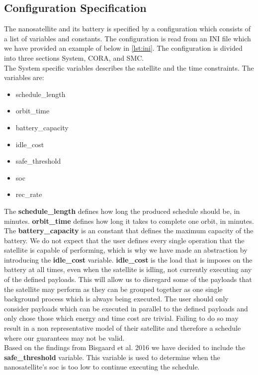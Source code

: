 \subsection{Configuration Specification} \label{subsec:init}
The nanosatellite and its battery is specified by a configuration which consists of a list of variables and constants. The configuration is read from an INI file which we have provided an example of below in \cref{lst:ini}.
The configuration is divided into three sections System, CORA, and SMC.\\
The System specific variables describes the satellite and the time constraints.
The variables are:
\begin{itemize}
	\item schedule\_length
	\item orbit\_time
	\item battery\_capacity
	\item idle\_cost
	\item safe\_threshold
	\item soc
	\item rec\_rate
\end{itemize}
The \textbf{schedule\_length} defines how long the produced schedule should be, in minutes. 
\textbf{orbit\_time} defines how long it takes to complete one orbit, in minutes. 
The \textbf{battery\_capacity} is an constant that defines the maximum capacity of the battery. We do not expect that the user defines every single operation that the satellite is capable of performing, which is why we have made an abstraction by introducing the \textbf{idle\_cost} variable. 
\textbf{idle\_cost} is the load that is imposes on the battery at all times, even when the satellite is idling, not currently executing any of the defined payloads.
This will allow us to disregard some of the payloads that the satellite may perform as they can be grouped together as one single background process which is always being executed.
The user should only consider payloads which can be executed in parallel to the defined payloads and only chose those which energy and time cost are trivial.
Failing to do so may result in a non representative model of their satellite and therefore a schedule where our guarantees may not be valid.\\
Based on the findings from Bisgaard et al. 2016\cite{gomx3} we have decided to include the \textbf{safe\_threshold} variable.
This variable is used to determine when the nanosatellite's \gls{soc} is too low to continue executing the schedule.
